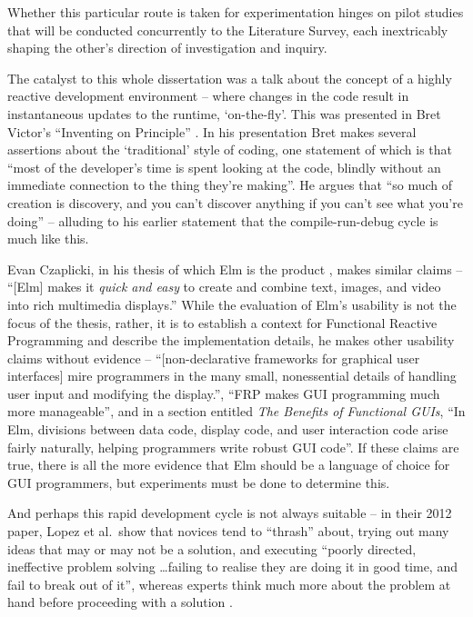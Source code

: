 \documentclass[11pt,openright,a4paper]{report}
\begin{document}
Whether this particular route is taken for experimentation hinges on pilot
studies that will be conducted concurrently to the Literature Survey,
each inextricably shaping the other's direction of investigation and inquiry. 

The catalyst to this whole dissertation was a talk about the concept of a highly
reactive development environment -- where changes in the code result in
instantaneous updates to the runtime, `on-the-fly'. This was presented in  Bret
Victor's ``Inventing on Principle'' \cite{Victor2012a}. In his presentation Bret
makes several assertions about the `traditional' style of coding, one statement
of which is that ``most of the developer's time is spent looking at the code,
blindly without an immediate connection to the thing they're making''. He argues
that ``so much of creation is discovery, and you can't discover anything if you
can't see what you're doing'' -- alluding to his earlier statement that the
compile-run-debug cycle is much like this. 

Evan Czaplicki, in his thesis of which Elm is the product
\cite{Czaplicki2012elm}, makes similar claims -- ``[Elm] makes it \textit{quick
and easy} to create and combine text, images, and video into rich multimedia
displays.'' While the evaluation of Elm's usability is not the focus of the thesis,
rather, it is to establish a context for Functional Reactive Programming and
describe the implementation details, he makes other usability claims without
evidence -- ``[non-declarative frameworks for graphical user interfaces] mire
programmers in the many small, nonessential details of handling user input and
modifying the display.'', ``FRP makes GUI programming much more manageable'',
and in a section entitled \textit{The Benefits of Functional GUIs}, ``In Elm,
divisions between data code, display code, and user interaction code arise
fairly naturally, helping programmers write robust GUI code''. If these claims
are true, there is all the more evidence that Elm should be a language of choice
for GUI programmers, but experiments must be done to determine this.

And perhaps this rapid development cycle is not always suitable -- in their 2012
paper, Lopez et al.\ show that novices tend to ``thrash'' about, trying out many
ideas that may or may not be a solution, and executing ``poorly directed,
ineffective problem solving \ldots failing to realise they are doing it in good
time, and fail to break out of it'', whereas experts think much more about
the problem at hand before proceeding with a solution \cite{Lopez2012a}.
\end{document}
